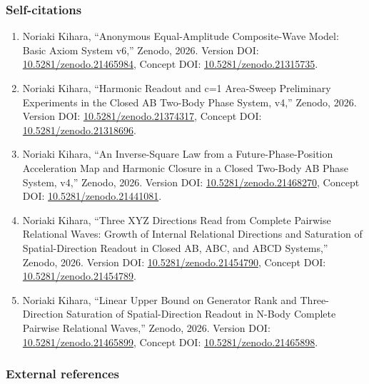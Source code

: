\documentclass[
  a4paper,
]{article}
\providecommand{\tightlist}{%
  \setlength{\itemsep}{0pt}\setlength{\parskip}{0pt}}
\begin{document}
\subsubsection{Self-citations}\label{self-citations}

\begin{enumerate}
\def\labelenumi{\arabic{enumi}.}
\tightlist
\item
  Noriaki Kihara, ``Anonymous Equal-Amplitude Composite-Wave Model:
  Basic Axiom System v6,'' Zenodo, 2026. Version DOI:
  \href{https://doi.org/10.5281/zenodo.21465984}{10.5281/zenodo.21465984},
  Concept DOI:
  \href{https://doi.org/10.5281/zenodo.21315735}{10.5281/zenodo.21315735}.
\item
  Noriaki Kihara, ``Harmonic Readout and c=1 Area-Sweep Preliminary
  Experiments in the Closed AB Two-Body Phase System, v4,'' Zenodo,
  2026. Version DOI:
  \href{https://doi.org/10.5281/zenodo.21374317}{10.5281/zenodo.21374317},
  Concept DOI:
  \href{https://doi.org/10.5281/zenodo.21318696}{10.5281/zenodo.21318696}.
\item
  Noriaki Kihara, ``An Inverse-Square Law from a Future-Phase-Position
  Acceleration Map and Harmonic Closure in a Closed Two-Body AB Phase
  System, v4,'' Zenodo, 2026. Version DOI:
  \href{https://doi.org/10.5281/zenodo.21468270}{10.5281/zenodo.21468270},
  Concept DOI:
  \href{https://doi.org/10.5281/zenodo.21441081}{10.5281/zenodo.21441081}.
\item
  Noriaki Kihara, ``Three XYZ Directions Read from Complete Pairwise
  Relational Waves: Growth of Internal Relational Directions and
  Saturation of Spatial-Direction Readout in Closed AB, ABC, and ABCD
  Systems,'' Zenodo, 2026. Version DOI:
  \href{https://doi.org/10.5281/zenodo.21454790}{10.5281/zenodo.21454790},
  Concept DOI:
  \href{https://doi.org/10.5281/zenodo.21454789}{10.5281/zenodo.21454789}.
\item
  Noriaki Kihara, ``Linear Upper Bound on Generator Rank and
  Three-Direction Saturation of Spatial-Direction Readout in N-Body
  Complete Pairwise Relational Waves,'' Zenodo, 2026. Version DOI:
  \href{https://doi.org/10.5281/zenodo.21465899}{10.5281/zenodo.21465899},
  Concept DOI:
  \href{https://doi.org/10.5281/zenodo.21465898}{10.5281/zenodo.21465898}.
\end{enumerate}

\subsubsection{External references}\label{external-references}
\end{document}
